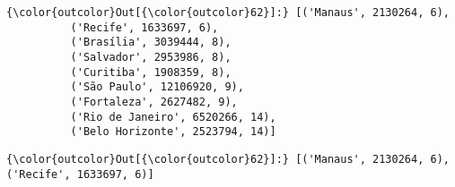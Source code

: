 \documentclass[11pt]{article}
\begin{document}
\begin{Verbatim}[commandchars=\\\{\}]
{\color{outcolor}Out[{\color{outcolor}62}]:} [('Manaus', 2130264, 6),
          ('Recife', 1633697, 6),
          ('Brasília', 3039444, 8),
          ('Salvador', 2953986, 8),
          ('Curitiba', 1908359, 8),
          ('São Paulo', 12106920, 9),
          ('Fortaleza', 2627482, 9),
          ('Rio de Janeiro', 6520266, 14),
          ('Belo Horizonte', 2523794, 14)]
\end{Verbatim}
            
\begin{Verbatim}[commandchars=\\\{\}]
{\color{outcolor}Out[{\color{outcolor}62}]:} [('Manaus', 2130264, 6), ('Recife', 1633697, 6)]
\end{Verbatim}
            

    
    
    
    
\end{document}
